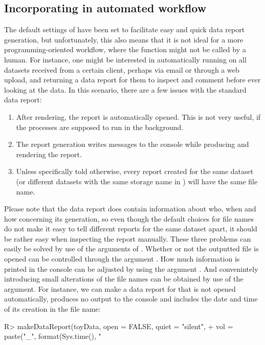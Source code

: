 \documentclass[article,shortnames]{jss}
\begin{document}
\subsection[Incorporating dataMaid in an automated workflow]{Incorporating  in automated workflow}
The default settings of  have been set to facilitate easy and quick data report generation, but unfortunately, this also means that it is not ideal for a more programming-oriented workflow, where the function might not be called by a human. For instance, one might be interested in automatically running  on all datasets received from a certain client, perhaps via email or through a web upload, and returning a data report for them to inspect and comment before ever looking at the data. In this scenario, there are a few issues with the standard data report:
\begin{enumerate}
\item After rendering, the report is automatically opened. This is not very useful, if the processes are supposed to run in the background.
\item The report generation writes messages to the console while producing and rendering the report.
\item Unless specifically told otherwise, every report created for the same dataset (or different datasets with the same storage name in ) will have the same file name.
\end{enumerate}
Please note that the data report does contain information about who, when and how concerning its generation, so even though the default choices for file names do not make it easy to tell different reports for the same dataset apart, it should be rather easy when inspecting the report manually. These three problems can easily be solved by use of the arguments of . Whether or not the outputted file is opened can be controlled through the argument . How much information is printed in the console can be adjusted by using the argument . And convenintely introducing small alterations of the file names can be obtained by use of the  argument. For instance, we can make a data report for  that is not opened automatically, produces no output to the console and includes the date and time of its creation in the file name:

\begin{Schunk}
\begin{Sinput}
R> makeDataReport(toyData, open = FALSE, quiet = "silent",
+    vol = paste("_", format(Sys.time(), "%
\end{Sinput}
\end{Schunk}
\end{document}
